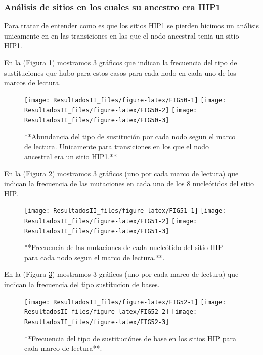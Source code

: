 \documentclass[
]{book}
\begin{document}
\hypertarget{anuxe1lisis-de-sitios-en-los-cuales-su-ancestro-era-hip1-1}{%
\subsubsection{Análisis de sitios en los cuales su ancestro era HIP1}\label{anuxe1lisis-de-sitios-en-los-cuales-su-ancestro-era-hip1-1}}

Para tratar de entender como es que los sitios HIP1 se pierden hicimos un análisis unicamente en en las transiciones en las que el nodo ancestral tenia un sitio HIP1.

En la (Figura \ref{fig:FIG50}) mostramos 3 gráficos que indican la frecuencia del tipo de sustituciones que hubo para estos casos para cada nodo en cada uno de los marcos de lectura.

\begin{figure}

{\centering \texttt{[image: ResultadosII\_files/figure-latex/FIG50-1]} \texttt{[image: ResultadosII\_files/figure-latex/FIG50-2]} \texttt{[image: ResultadosII\_files/figure-latex/FIG50-3]} 

}

\caption{**Abundancia del tipo de sustitución por cada nodo segun el marco de lectura. Unicamente para transiciones en los que el nodo ancestral era un sitio HIP1.**}\label{fig:FIG50}
\end{figure}

En la (Figura \ref{fig:FIG51}) mostramos 3 gráficos (uno por cada marco de lectura) que indican la frecuencia de las mutaciones en cada uno de los 8 nucleótidos del sitio HIP.

\begin{figure}

{\centering \texttt{[image: ResultadosII\_files/figure-latex/FIG51-1]} \texttt{[image: ResultadosII\_files/figure-latex/FIG51-2]} \texttt{[image: ResultadosII\_files/figure-latex/FIG51-3]} 

}

\caption{**Frecuencia de las mutaciones de cada nucleótido del sitio HIP para cada nodo segun el marco de lectura.**.}\label{fig:FIG51}
\end{figure}

En la (Figura \ref{fig:FIG52}) mostramos 3 gráficos (uno por cada marco de lectura) que indican la frecuencia del tipo sustitucion de bases.

\begin{figure}

{\centering \texttt{[image: ResultadosII\_files/figure-latex/FIG52-1]} \texttt{[image: ResultadosII\_files/figure-latex/FIG52-2]} \texttt{[image: ResultadosII\_files/figure-latex/FIG52-3]} 

}

\caption{**Frecuencia del tipo de sustituciónes de base en los sitios HIP para cada marco de lectura**.}\label{fig:FIG52}
\end{figure}
\end{document}
